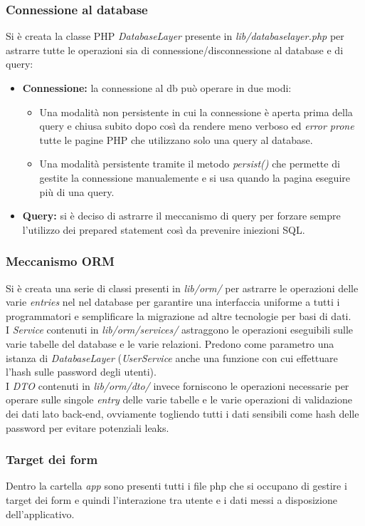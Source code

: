 \subsubsection{Connessione al database}
Si è creata la classe PHP \textit{DatabaseLayer} presente in \textit{lib/databaselayer.php} per astrarre tutte le operazioni sia di connessione/disconnessione al database e di query:
\begin{itemize}
    \item \textbf{Connessione:} la connessione al db può operare in due modi:
    \begin{itemize}
        \item Una modalità non persistente in cui la connessione è aperta prima della query e chiusa subito dopo così da rendere meno verboso ed \textit{error prone} tutte le pagine PHP che utilizzano solo una query al database.
        \item Una modalità persistente tramite il metodo \textit{persist()} che permette di gestite la connessione manualemente e si usa quando la pagina eseguire più di una query.
    \end{itemize}
    \item \textbf{Query:} si è deciso di astrarre il meccanismo di query per forzare sempre l'utilizzo dei prepared statement così da prevenire iniezioni SQL.
\end{itemize}

\subsubsection{Meccanismo ORM}
Si è creata una serie di classi presenti in \textit{lib/orm/} per astrarre le operazioni delle varie \textit{entries} nel nel database per garantire una interfaccia uniforme a tutti i programmatori e semplificare la migrazione ad altre tecnologie per basi di dati.\\
I \textit{Service} contenuti in \textit{lib/orm/services/} astraggono le operazioni eseguibili sulle varie tabelle del database e le varie relazioni. Predono come parametro una istanza di \textit{DatabaseLayer} (\textit{UserService} anche una funzione con cui effettuare l'hash sulle password degli utenti).\\
I \textit{DTO} contenuti in \textit{lib/orm/dto/} invece forniscono le operazioni necessarie per operare sulle singole \textit{entry} delle varie tabelle e le varie operazioni di validazione dei dati lato back-end, ovviamente togliendo tutti i dati sensibili come hash delle password per evitare potenziali leaks.

\subsubsection{Target dei form}
Dentro la cartella \textit{app} sono presenti tutti i file php che si occupano di gestire i target dei form e quindi l'interazione tra utente e i dati messi a disposizione dell'applicativo.